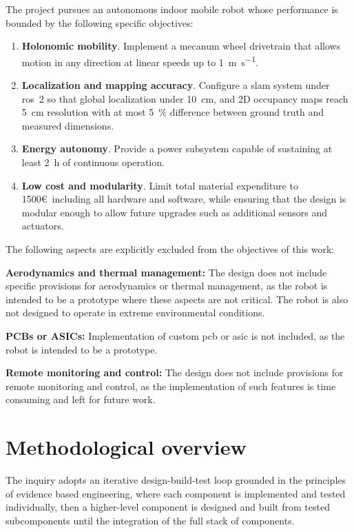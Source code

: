 The project pursues an autonomous indoor mobile robot whose performance is bounded by the following specific objectives:

\begin{enumerate}
  \item \textbf{Holonomic mobility}.
        Implement a mecanum wheel drivetrain that allows motion in any direction at linear speeds up to \SI[per-mode=fraction,fraction-function=\tfrac]{1}{\metre\per\second}.

  \item \textbf{Localization and mapping accuracy}.
        Configure a \gls{slam} system under \gls{ros}~2 so that global localization under \SI{10}{\centi\metre}, and 2D occupancy maps reach \SI{5}{\centi\metre} resolution with at most \SI{5}{\percent} difference between ground truth and measured dimensions.

  \item \textbf{Energy autonomy}.
        Provide a power subsystem capable of sustaining at least \SI{2}{\hour} of continuous operation.

  \item \textbf{Low cost and modularity}.
        Limit total material expenditure to 1500\euro~including all hardware and software, while ensuring that the design is modular enough to allow future upgrades such as additional sensors and actuators.
\end{enumerate}

The following aspects are explicitly excluded from the objectives of this work:

\textbf{Aerodynamics and thermal management:} The design does not include specific provisions for aerodynamics or thermal management, as the robot is intended to be a prototype where these aspects are not critical. The robot is also not designed to operate in extreme environmental conditions.

\textbf{PCBs or ASICs:} Implementation of custom \gls{pcb} or \gls{asic} is not included, as the robot is intended to be a prototype.

\textbf{Remote monitoring and control:} The design does not include provisions for remote monitoring and control, as the implementation of such features is time consuming and left for future work.

\section{Methodological overview}
The inquiry adopts an iterative design-build-test loop grounded in the principles of evidence based engineering, where each component is implemented and tested individually, then a higher-level component is designed and built from tested subcomponents until the integration of the full stack of components.

